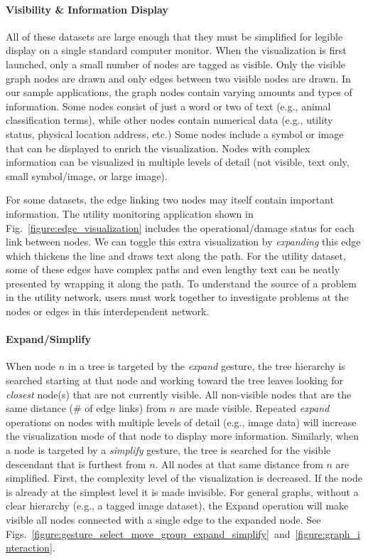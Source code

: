 \documentclass[runningheads,a4paper]{llncs}
\begin{document}
\paragraph{\bf Visibility \& Information Display}
All of these datasets are large enough that they must be simplified
for legible display on a single standard computer monitor.  When the
visualization is first launched, only a small number of nodes are
tagged as visible.  Only the visible graph nodes are drawn and only
edges between two visible nodes are drawn.
%
In our sample applications, the graph nodes contain varying amounts
and types of information.  Some nodes consist of just a word or two of
text (e.g., animal classification terms), while other nodes contain
numerical data (e.g., utility status, physical location address, etc.)
Some nodes include a symbol or image that can be displayed to enrich
the visualization.  Nodes with complex information can be visualized
in multiple levels of detail (not visible, text only, small
symbol/image, or large image).

For some datasets, the edge linking two nodes may itself contain
important information.  The utility monitoring application shown in
Fig.~\ref{figure:edge_visualization} includes the operational/damage
status for each link between nodes.  We can toggle this extra
visualization by {\em expanding} this edge which thickens the line and
draws text along the path.  For the utility dataset, some of these
edges have complex paths and even lengthy text can be neatly presented
by wrapping it along the path.  To understand the source of a problem
in the utility network, users must work together to investigate
problems at the nodes or edges in this interdependent network.

\vspace{-0.1in}
\paragraph{\bf Expand/Simplify}
When node $n$ in a tree is targeted by the {\em expand} gesture, the
tree hierarchy is searched starting at that node and working toward
the tree leaves looking for {\em closest} node(s) that are not
currently visible.  All non-visible nodes that are the same distance
(\# of edge links) from $n$ are made visible.  Repeated {\em expand}
operations on nodes with multiple levels of detail (e.g., image data)
will increase the visualization mode of that node to display more
information.  
Similarly, when a
node is targeted by a {\em simplify} gesture, the tree is searched for
the visible descendant that is furthest from $n$.  All nodes at that
same distance from $n$ are simplified.  First, the complexity level of
the visualization is decreased.  If the node is already at the
simplest level it is made invisible.  For general graphs, without a
clear hierarchy (e.g., a tagged image dataset), the Expand operation
will make visible all nodes connected with a single edge to the
expanded node.  See Figs.~\ref{figure:gesture_select_move_group_expand_simplify}~and~\ref{figure:graph_interaction}.
\vspace{-0.1in}
\end{document}
